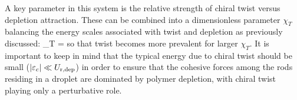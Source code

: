 

%

A key parameter in this system is the relative strength of chiral twist versus depletion attraction. These can be combined into a dimensionless parameter $\chi_{T}$ balancing the energy scales associated with twist and depletion as previously discussed:
\beq
\chi_{T} =  
\eeq
so that twist becomes more prevalent for larger $\chi_{T}$. It is important to keep in mind that the typical energy due to chiral twist should be small ($ | \varepsilon_{c} | \ll U_{\rm r,dep} $) in order to ensure that the cohesive forces among the rods residing in a droplet are dominated by polymer depletion, with chiral twist playing only a perturbative role.


